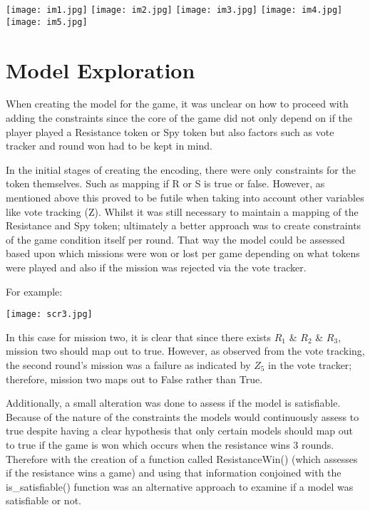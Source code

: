 \documentclass[pdftex,10pt,a4paper]{article}
\numberwithin{equation}{section} %
\begin{document}
\texttt{[image: im1.jpg]}\newline
\texttt{[image: im2.jpg]}\newline
\texttt{[image: im3.jpg]}\newline
\texttt{[image: im4.jpg]}\newline
\texttt{[image: im5.jpg]}\newline

\section*{Model Exploration}

When creating the model for the game, it  was unclear on  how to proceed with adding the constraints since the core of the game did not only depend on if the player played a Resistance token or Spy token but also factors such as vote tracker and round won had to be kept in mind.

In the initial stages of creating the encoding, there were only constraints for the token themselves. Such as mapping if R or S is true or false. However, as mentioned above this proved to be futile when taking into account other variables like vote tracking (Z). Whilst it was still necessary to maintain a mapping of the Resistance and Spy token; ultimately a better approach was to create constraints of the game condition itself per round. That way the model could be assessed based upon which missions were won or lost per game depending on what tokens were played and also if the mission was rejected via the vote tracker. \newline

For example: \newline

\texttt{[image: scr3.jpg]}\newline

In this case for mission two, it is clear that since there exists $R_1$ \& $R_2$ \& $R_3$, mission two should map out to true. However, as observed from the vote tracking, the second round’s mission was a failure as indicated by $Z_5$ in the vote tracker; therefore, mission two maps out to False rather than True.\newline

Additionally, a small alteration was done to assess if the model is satisfiable. Because of the nature of the constraints the models would continuously assess to true despite having a clear hypothesis that only certain models should map out to true if the game is won which occurs when the resistance wins 3 rounds. Therefore with the creation of a function called ResistanceWin() (which assesses if the resistance wins a game) and using that information conjoined with the is\_satisfiable() function was an alternative approach to examine if a model was satisfiable or not. \newline
\end{document}

